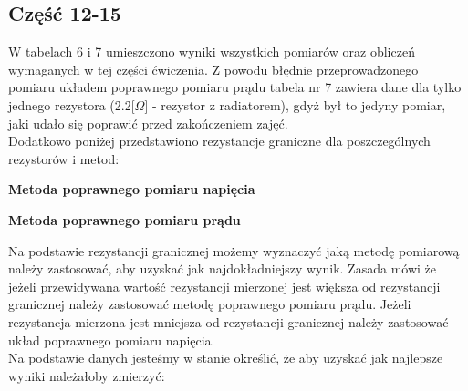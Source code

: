 \documentclass[11pt]{article}
\begin{document}
    \subsection*{Część 12-15}
    W tabelach 6 i 7 umieszczono wyniki wszystkich pomiarów oraz obliczeń wymaganych w tej części ćwiczenia. Z
    powodu błędnie przeprowadzonego pomiaru układem poprawnego pomiaru prądu tabela nr 7 zawiera dane dla tylko
    jednego rezystora (2.2[$\Omega$] - rezystor z radiatorem), gdyż był to jedyny pomiar, jaki udało się poprawić
    przed zakończeniem zajęć.\\
    Dodatkowo poniżej przedstawiono rezystancje graniczne dla poszczególnych rezystorów i metod:
    \begin{center}
        \textbf{Metoda poprawnego pomiaru napięcia}
    \end{center}
    \begin{center}
    \end{center}
    \begin{center}
        \textbf{Metoda poprawnego pomiaru prądu}
    \end{center}
    \begin{center}
    \end{center}
    Na podstawie rezystancji granicznej możemy wyznaczyć jaką metodę pomiarową należy zastosować, aby uzyskać
    jak najdokładniejszy wynik. Zasada mówi że jeżeli przewidywana wartość rezystancji mierzonej jest większa
    od rezystancji granicznej należy zastosować metodę poprawnego pomiaru prądu. Jeżeli rezystancja mierzona
    jest mniejsza od rezystancji granicznej należy zastosować układ poprawnego pomiaru napięcia.\\
    \indent Na podstawie danych jesteśmy w stanie określić, że aby uzyskać jak najlepsze wyniki należałoby zmierzyć:
\end{document}

